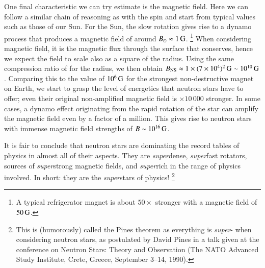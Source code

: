 One final characteristic we can try  estimate is the magnetic field. %
Here we can follow a similar chain of reasoning as with the spin and start from typical values such as those of our Sun.
For the Sun, the slow rotation gives rise to a dynamo process that produces a magnetic field of around $B_{\odot} \approx 1\, \mathrm{G}$.%
\footnote{A typical refrigerator magnet is about $50\times$ stronger with a magnetic field of $50\, \mathrm{G}$.}
When considering magnetic field, it is the magnetic flux through the surface that conserves, hence we expect the field to scale also as a square of the radius.
Using the same compression ratio of  for the radius, we then obtain $B_{\mathrm{NS}} \approx 1 \times (7 \times 10^{4})^2 \, \mathrm{G} \sim 10^{10} \, \mathrm{G}$.
Comparing this to the value of $10^6\, \mathrm{G}$ for the strongest non-destructive magnet on Earth, we start to grasp the level of energetics that neutron stars have to offer; even their original non-amplified magnetic field is $\times 10\,000$ stronger.
In some cases, a dynamo effect originating from the rapid rotation of the star can amplify the magnetic field even by a factor of a million. 
This gives rise to neutron stars with immense magnetic field strengths of $B \sim 10^{16} \, \mathrm{G}$.

It is fair to conclude that neutron stars are dominating the record tables of physics in almost all of their aspects.
They are \emph{super}dense, \emph{super}fast rotators, sources of \emph{super}strong magnetic fields, and \emph{super}rich in the range of physics involved.
In short: they are the \emph{super}stars of physics!%
\footnote{
    This is (humorously) called the Pines theorem as everything is \emph{super}- when considering neutron stars, as postulated by David Pines in a talk given at the conference on Neutron Stars: Theory and Observation (The NATO Advanced Study Institute, Crete, Greece, September 3–14, 1990).
}
